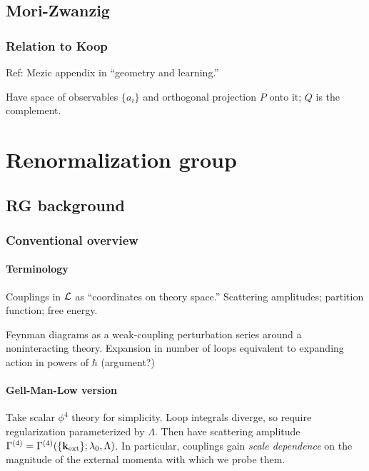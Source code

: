 \documentclass[notitlepage,openany,11pt]{report}
\theoremstyle{plain}%
\numberwithin{equation}{section}
\begin{document}
\section{Mori-Zwanzig}

\subsection{Relation to Koop}
Ref: Mezic appendix in ``geometry and learning.''

Have space of observables $\{ a_{i} \}$ and orthogonal projection $P$ onto it; $Q$ is the complement. 



\chapter{Renormalization group}



\section{RG background}

\subsection{Conventional overview}

\subsubsection{Terminology}
Couplings in $\mathcal{L}$ as ``coordinates on theory space.'' Scattering amplitudes; partition function; free energy. 

Feynman diagrams as a weak-coupling perturbation series around a noninteracting theory. Expansion in number of loops equivalent to expanding action in powers of $\hbar$ (argument?)

\subsubsection{Gell-Man-Low version} 

Take scalar $\phi^{4}$ theory for simplicity. Loop integrals diverge, so require regularization parameterized by $\Lambda$. Then have scattering amplitude $\Gamma^{(4)} = \Gamma^{(4)}(\{\mathbf{k}_{\text{ext}}\}; \lambda_{0}, \Lambda)$. In particular, couplings gain \textit{scale dependence} on the magnitude of the external momenta with which we probe them.
\end{document}
